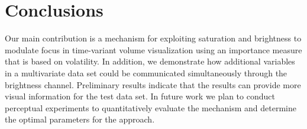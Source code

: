 \section{Conclusions}
Our main contribution is a mechanism for exploiting saturation and brightness to modulate focus in time-variant volume visualization using an importance measure that is based on volatility. In addition, we demonstrate how additional variables in a multivariate data set could be communicated simultaneously through the brightness channel. Preliminary results indicate that the results can provide more visual information for the test data set. In future work we plan to conduct perceptual experiments to quantitatively evaluate the mechanism and determine the optimal parameters for the approach.

